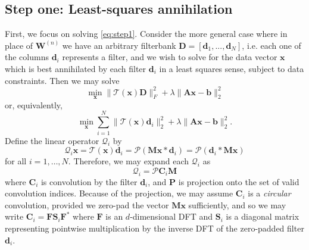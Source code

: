 \documentclass[10pt, twocolumn, twoside]{IEEEtran}
\newcommand{\mbf}{\mathbf}
\begin{document}
\subsection{Step one: Least-squares annihilation}
First, we focus on solving \eqref{eq:step1}. Consider the more general case where in place of $\mathbf W^{(n)}$ we have an arbitrary filterbank $\mathbf D = [\mathbf d_1,...,\mathbf d_N]$, i.e. each one of the columns $\mathbf d_i$ represents a filter, and we wish to solve for the data vector $\mbf x$ which is best annihilated by each filter $\mathbf d_i$ in a least squares sense, subject to data constraints. Then we may solve
\[
\min_{\mbf x} \|\mathcal{T}(\mbf x) \mathbf D\|_F^2 + \lambda\|\mbf A \mbf x - \mbf b\|_2^2
\]
or, equivalently,
\[
\min_{\mbf x} \sum_{i=1}^N\|\mathcal{T}(\mbf x) \mbf d_i \|_2^2 + \lambda\|\mbf A \mbf x - \mathbf b\|_2^2.
\]
Define the linear operator $\mathcal{Q}_i$ by 
\[
\mathcal{Q}_i \mbf x = \mathcal{T}(\mbf x)\mathbf d_i = \mathcal{P}(\mbf M\mbf x \ast \mbf d_i) = \mathcal{P}( \mbf d_i \ast \mbf M\mbf x)
\]
for all $i=1,\ldots,N$. Therefore, we may expand each $\mathcal{Q}_i$ as
\[
\mathcal{Q}_i = \mathcal{P} \mathbf C_i \mathbf M
\]
where $\mathbf C_i$ is convolution by the filter $\mathbf d_i$, and $\mathbf P$ is projection onto the set of valid convolution indices. Because of the projection, we may assume $\mathbf C_i$ is a \emph{circular} convolution, provided we zero-pad the vector $\mbf M \mbf x$ sufficiently, and so we may write $\mathbf C_i = \mathbf F \mathbf S_i \mathbf F^*$ where $\mathbf F$ is an $d$-dimensional DFT and $\mathbf S_i$ is a diagonal matrix representing pointwise multiplication by the inverse DFT of the zero-padded filter $\mathbf d_i$.
\end{document}
